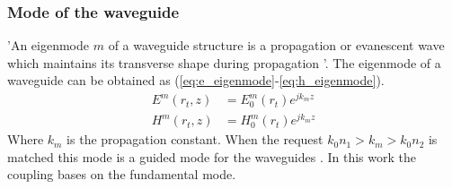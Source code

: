 \subsubsection*{Mode of the waveguide}
'An eigenmode $m$ of a waveguide structure is a propagation or evanescent wave which maintains its transverse shape during propagation '\cite{integrated_optics}. The eigenmode of a waveguide can be obtained as (\ref{eq:e_eigenmode}-\ref{eq:h_eigenmode}).  
\begin{align}
E^{m}(r_{t},z)&=E^{m}_{0}(r_{t})e^{jk_{m}z}
\label{eq:e_eigenmode}\\
H^{m}(r_{t},z)&=H^{m}_{0}(r_{t})e^{jk_{m}z}
\label{eq:h_eigenmode}
\end{align}
Where $k_{m}$ is the propagation constant. When the request  $k_{0}n_{1}>k_{m}>k_{0}n_{2}$ is matched this mode is a guided mode for the waveguides \cite{script_FT_TET}. In this work the coupling bases on the fundamental mode.
